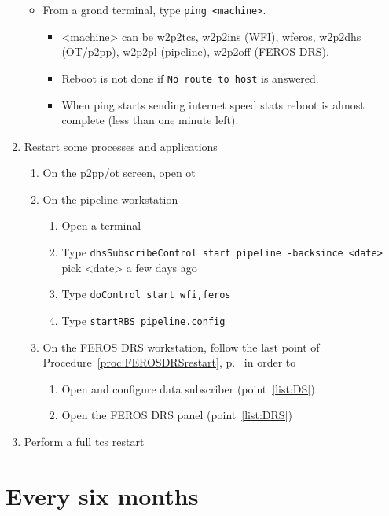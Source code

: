 \documentclass[11pt,fleqn]{book}
\def\procref#1{Procedure~\ref{proc:#1}, p.~\pageref{proc:#1}}
\begin{document}
\begin{enumerate}
\begin{itemize}
        \item From a grond terminal, type \texttt{ping <machine>}.
             \begin{itemize}
             \item <machine> can be w2p2tcs, w2p2ins (WFI), wferos, w2p2dhs (OT/p2pp), w2p2pl (pipeline), w2p2off (FEROS DRS). 
             \item Reboot is not done if \texttt{No route to host} is answered.
             \item When ping starts sending internet speed stats reboot is almost complete (less than one minute left).
             \end{itemize}
    \end{itemize}
\item Restart some processes and applications
    \begin{enumerate}
        \item On the \gls{p2pp}/\gls{ot} screen, open \gls{ot}
        \item On the pipeline workstation
             \begin{enumerate}
                \item Open  a terminal
                \item Type \texttt{dhsSubscribeControl start pipeline -backsince <date>}\\
            pick <date> a few days ago
                \item Type \texttt{doControl start wfi,feros}
                \item Type \texttt{startRBS pipeline.config}
             \end{enumerate}
        \item On the FEROS DRS workstation, follow the last point of \procref{FEROSDRSrestart} in order to
             \begin{enumerate}
                \item Open and configure data subscriber (point~\ref{list:DS})
                \item Open the FEROS DRS panel (point~\ref{list:DRS})
             \end{enumerate}
    \end{enumerate}
\item \label{list:soft:tcs}Perform a full \gls{tcs} restart
\end{enumerate}

\section{Every six months}
\end{document}
